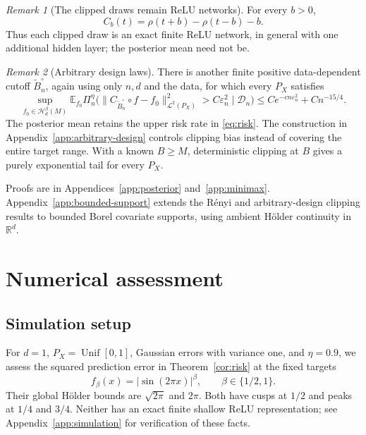 \documentclass[11pt,a4paper]{article}
\theoremstyle{remark}
\newtheorem{remark}{Remark}
\newcommand{\Hcal}{\mathcal H}
\newcommand{\Dcal}{\mathcal D}
\newcommand{\Lcal}{\mathcal L}
\newcommand{\E}{\mathbb E}
\newcommand{\norm}[1]{\lVert#1\rVert}
\newcommand{\abs}[1]{\lvert#1\rvert}
\DeclareMathOperator{\Unif}{Unif}
\begin{document}
\begin{remark}[The clipped draws remain ReLU networks]
For every $b>0$,
\[
C_b(t)=\rho(t+b)-\rho(t-b)-b.
\]
Thus each clipped draw is an exact finite ReLU network, in general
with one additional hidden layer; the posterior mean need not be.
\end{remark}

\begin{remark}[Arbitrary design laws]\label{rem:arbitrary-design}
There is another finite positive data-dependent cutoff
$\widetilde B_n^\circ$, again using only $n,d$ and the data, for
which every $P_X$ satisfies
\begin{equation}\label{eq:designfree-l2}
\sup_{f_0\in\Hcal_d^\beta(M)}\E_{f_0}\Pi_n^\eta
\bigl(\norm{C_{\widetilde B_n^\circ}\circ f-f_0}_{\Lcal^2(P_X)}^2
>C\varepsilon_n^2\mid\Dcal_n\bigr)
\leq Ce^{-cn\varepsilon_n^2}+Cn^{-15/4}.
\end{equation}
The posterior mean retains the upper risk rate in \eqref{eq:risk}.
The construction in Appendix~\ref{app:arbitrary-design} controls
clipping bias instead of covering the entire target range.
With a known $B\geq M$, deterministic clipping at $B$ gives a purely
exponential tail for every $P_X$.
\end{remark}

Proofs are in Appendices~\ref{app:posterior} and~\ref{app:minimax}.
Appendix~\ref{app:bounded-support} extends the R\'enyi and
arbitrary-design clipping results to bounded Borel covariate supports,
using ambient H\"older continuity in $\mathbb R^d$.

\setlength{\dbltextfloatsep}{6pt plus 2pt minus 2pt}

\section{Numerical assessment}
\label{sec:simulation}

\subsection{Simulation setup}
For $d=1$, $P_X=\Unif[0,1]$, Gaussian errors with variance one, and
$\eta=0.9$, we assess the squared prediction error in
{Theorem~\ref{cor:risk}} at the fixed targets
{
\[
f_\beta(x)=\abs{\sin(2\pi x)}^\beta,
\qquad \beta\in\{1/2,1\}.
\]
Their global H\"older bounds are $\sqrt{2\pi}$ and $2\pi$.
Both have cusps at $1/2$ and peaks at $1/4$ and $3/4$.
Neither has an exact finite shallow ReLU representation;
see Appendix~\ref{app:simulation} for verification of these facts.}
\end{document}
